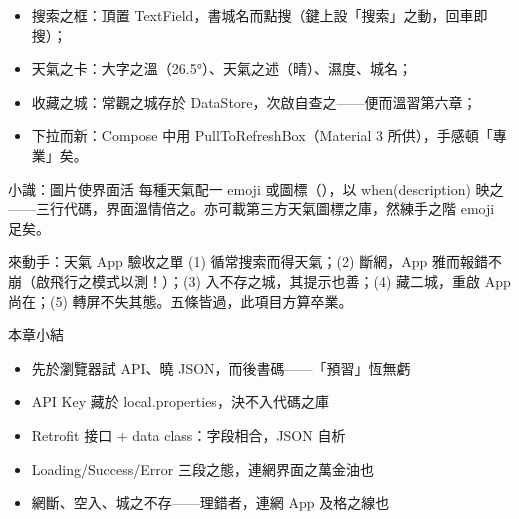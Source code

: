 

\begin{itemize}
  \item 搜索之框：頂置 TextField，書城名而點搜（鍵上設「搜索」之動，回車即搜）；
  \item 天氣之卡：大字之溫（26.5°）、天氣之述（晴）、濕度、城名；
  \item 收藏之城：常觀之城存於 DataStore，次啟自查之——便而溫習第六章；
  \item 下拉而新：Compose 中用 PullToRefreshBox（Material 3 所供），手感頓「專業」矣。
\end{itemize}

\begin{tcbinfo}{小識：圖片使界面活}
每種天氣配一 emoji 或圖標（），以 when(description) 映之——三行代碼，界面溫情倍之。亦可載第三方天氣圖標之庫，然練手之階 emoji 足矣。

\end{tcbinfo}

\begin{tcbpractice}{來動手：天氣 App 驗收之單}
(1) 循常搜索而得天氣；(2) 斷網，App 雅而報錯不崩（啟飛行之模式以測！）；(3) 入不存之城，其提示也善；(4) 藏二城，重啟 App 尚在；(5) 轉屏不失其態。五條皆過，此項目方算卒業。

\end{tcbpractice}

\begin{tcbsummary}{本章小結}
\begin{itemize}
  \item 先於瀏覽器試 API、曉 JSON，而後書碼——「預習」恆無虧
  \item API Key 藏於 local.properties，決不入代碼之庫
  \item Retrofit 接口 + data class：字段相合，JSON 自析
  \item Loading/Success/Error 三段之態，連網界面之萬金油也
  \item 網斷、空入、城之不存——理錯者，連網 App 及格之線也
\end{itemize}

\end{tcbsummary}
